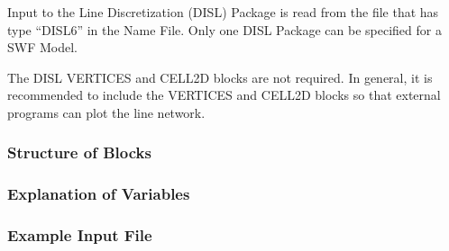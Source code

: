 Input to the Line Discretization (DISL) Package is read from the file that has type ``DISL6'' in the Name File.  Only one DISL Package can be specified for a SWF Model.

The DISL VERTICES and CELL2D blocks are not required.  In general, it is recommended to include the VERTICES and CELL2D blocks so that external programs can plot the line network. 


\vspace{5mm}
\subsubsection{Structure of Blocks}






\vspace{5mm}
\subsubsection{Explanation of Variables}
\begin{description}

\end{description}

\vspace{5mm}
\subsubsection{Example Input File}

